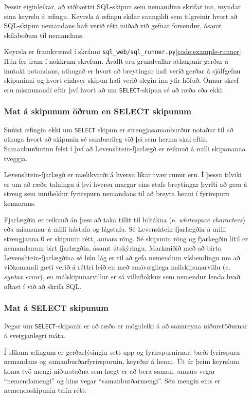 \documentclass[a4paper,12pt,twoside,BCOR=10mm]{scrbook}
\begin{document}
Þessir eiginleikar, að viðbættri SQL-skipun sem nemandinn skrifar inn, myndar eina keyrslu á æfingu. Keyrsla á æfingu skilar sanngildi sem tilgreinir hvort að SQL-skipun nemandans hafi verið rétt miðað við gefnar forsendur, ásamt skilaboðum til nemandans.

Keyrsla er framkvæmd í skránni \texttt{sql\_web/sql\_runner.py}\ref{code:example-runner}. Hún fer fram í nokkrum skrefum. Ávallt eru grundvallar-athuganir gerðar á inntaki notandans, athugað er hvort að breytingar hafi verið gerðar á sjálfgefnu skipuninni og hvort einhver skipun hafi verið slegin inn yfir höfuð. Önnur skref eru mismunandi eftir því hvort að um \texttt{SELECT}-skipun sé að ræða eða ekki.

\subsubsection{Mat á skipunum öðrum en SELECT skipunum}
Snúist æfingin ekki um \texttt{SELECT} skipun er strengjasamanburður notaður til að athuga hvort að skipunin sé sambærileg við þá sem herma skal eftir. Samanburðurinn felst í því að Levenshtein-fjarlægð er reiknuð á milli skipananna tveggja. 

Levenshtein-fjarlægð er mælikvarði á hversu líkar tvær runur eru. Í þessu tilviki er um að ræða talningu á því hversu margar eins stafs breytingar þyrfti að gera á streng sem inniheldur fyrirspurn nemandans til að breyta henni í fyrirspurn kennarans.

Fjarlægðin er reiknuð án þess að taka tillit til biltákna (e. \emph{whitespace characters}) eða mismunar á milli hástafa og lágstafa. Sé Levenshtein-fjarlægðin á milli strengjanna 0 er skipunin rétt, annars röng. Sé skipunin röng og fjarlægðin lítil er nemandanum birt fjarlægðin, ásamt útskýringu. Markmiðið með að birta Levenshtein-fjarlægðina sé hún lág er til að gefa nemendum vísbendingu um að viðkomandi gæti verið á réttri leið en með smávægilega málskipunarvillu (e. \emph{syntax error}), en málskipunarvillur er sá villuflokkur sem nemendur lenda hvað oftast í við að skrifa SQL\cite{ahadi2016students}.

\subsubsection{Mat á SELECT skipunum}
Þegar um \texttt{SELECT}-skipanir er að ræða er möguleiki á að sannreyna niðurstöðurnar á sveigjanlegri máta.

Í slíkum æfingum er gerðarlýsingin sett upp og fyrirspurnirnar, bæði fyrirspurn nemandans og samanburðarfyrirspurnin, keyrðar á henni. Út úr þeim keyrslum koma tvö mengi niðurstaðna sem hægt er að bera saman, annars vegar ``nemendamengi'' og hins vegar ``samanburðarmengi''. Séu mengin eins er nemendaskipunin talin rétt.
\end{document}
